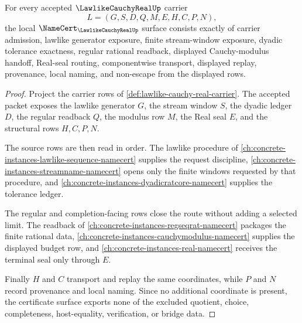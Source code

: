 \begin{theorem}
\label{thm:lawlike-cauchy-real-namecert-obligations}
For every accepted $\LawlikeCauchyRealUp$ carrier
$$
L=(G,S,D,Q,M,E,H,C,P,N),
$$
the local $\NameCert_{\LawlikeCauchyRealUp}$ surface consists exactly of carrier admission, lawlike generator exposure, finite stream-window exposure, dyadic tolerance exactness, regular rational readback, displayed Cauchy-modulus handoff, Real-seal routing, componentwise transport, displayed replay, provenance, local naming, and non-escape from the displayed rows.
\end{theorem}
\begin{proof}
Project the carrier rows of \autoref{def:lawlike-cauchy-real-carrier}. The accepted packet exposes the lawlike generator $G$, the stream window $S$, the dyadic ledger $D$, the regular readback $Q$, the modulus row $M$, the Real seal $E$, and the structural rows $H,C,P,N$.

The source rows are then read in order. The lawlike procedure of \autoref{ch:concrete-instances-lawlike-sequence-namecert} supplies the request discipline, \autoref{ch:concrete-instances-streamname-namecert} opens only the finite windows requested by that procedure, and \autoref{ch:concrete-instances-dyadicratcore-namecert} supplies the tolerance ledger.

The regular and completion-facing rows close the route without adding a selected limit. The readback of \autoref{ch:concrete-instances-regseqrat-namecert} packages the finite rational data, \autoref{ch:concrete-instances-cauchymodulus-namecert} supplies the displayed budget row, and \autoref{ch:concrete-instances-real-namecert} receives the terminal seal only through $E$.

Finally $H$ and $C$ transport and replay the same coordinates, while $P$ and $N$ record provenance and local naming. Since no additional coordinate is present, the certificate surface exports none of the excluded quotient, choice, completeness, host-equality, verification, or bridge data.
\end{proof}

